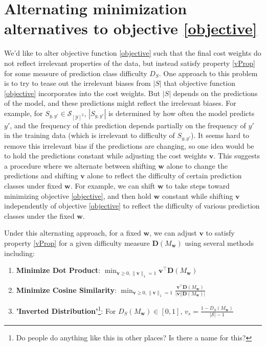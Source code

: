 \documentclass[11pt,letterpaper]{article}
\begin{document}
\section{Alternating minimization alternatives to objective \ref{objective}}

We'd like to alter objective function \ref{objective} such that the final 
cost weights do not reflect irrelevant properties of the data, but instead 
satisfy property \ref{vProp} for some measure of prediction class 
difficulty $D_S$.  One approach to this problem is to try to tease out
the irrelevant biases from $|S|$ that objective function \ref{objective} 
incorporates into the cost weights.  But $|S|$ depends on the predictions 
of the model, and these predictions might reflect the irrelevant biases.  For 
example, for $S_{y,y'}\in\mathcal{S}_{[\mathcal{Y}]^2}$, 
$|S_{y,y'}|$ is determined by how often the model predicts $y'$, and the 
frequency of this prediction depends partially on the frequency of $y'$ in the 
training data (which is irrelevant to difficulty of $S_{y,y'}$).  It seems 
hard to remove this irrelevant bias if the predictions are 
changing, so one idea would be to hold
the predictions constant while adjusting the cost weights $\mathbf{v}$.  This 
suggests a procedure where we alternate between shifting $\mathbf{w}$ alone 
to change the predictions and shifting 
$\mathbf{v}$ alone to reflect the difficulty of certain prediction classes 
under fixed $\mathbf{w}$. For example, we can shift $\mathbf{w}$ to take 
steps toward minimizing objective \ref{objective}, and then hold $\mathbf{w}$ 
constant while shifting $\mathbf{v}$ independently of objective \ref{objective}
to reflect the difficulty of various prediction classes under the fixed 
$\mathbf{w}$.

Under this alternating approach, for a fixed $\mathbf{w}$, we can adjust 
$\mathbf{v}$ to satisfy property \ref{vProp} for a given difficulty measure 
$\mathbf{D}(M_\mathbf{w})$ using several methods including:

\begin{enumerate}

\item \textbf{Minimize Dot Product}: $\min_{\mathbf{v}\geq 0,\|\mathbf{v}\|_1=1} \mathbf{v}^\top \mathbf{D}(M_\mathbf{w})$

\item \textbf{Minimize Cosine Similarity}: $\min_{\mathbf{v}\geq 0,\|\mathbf{v}\|_1=1} \frac{\mathbf{v}^\top \mathbf{D}(M_\mathbf{w})}{|\mathbf{v}||\mathbf{D}(M_\mathbf{w})|}$

\item \textbf{'Inverted Distribution'}\footnote{Do people do 
anything like this in other places? Is there a name for this?}: 
For $D_S(M_\mathbf{w})\in[0,1]$,  $v_s=\frac{1-D_S(M_\mathbf{w})}{|\mathcal{S}|-1}$

\end{enumerate}
\end{document}

